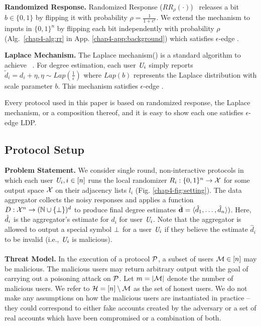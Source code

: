 \noindent\textbf{Randomized Response.} Randomized Response ($RR_\rho(\cdot)$)~\cite{RR} releases a bit $b \in \{0,1\}$ by
flipping it with probability $\rho = \frac{1}{1+e^\epsilon}$. We extend the
mechanism to inputs in $\{0,1\}^n$ by flipping each bit independently with
probability $\rho$ (Alg.~\ref{chap4-alg:rr} in App. \ref{chap4-app:background}) which satisfies
 $\epsilon$-edge \DP. 
 
\noindent\textbf{Laplace Mechanism.} 
The Laplace mechanism(\RLap) is a standard algorithm to achieve \DP~\cite{Dwork}. For degree estimation, each user $\textit{U}_i$ simply reports $\tilde{d}_i=d_i+\eta, \eta \sim Lap(\frac{1}{\epsilon})$ where $Lap(b)$ represents the Laplace distribution with scale parameter $b$. This mechanism satisfies $\epsilon$-edge \DP. 

Every protocol used in this paper is based on randomized response, the Laplace mechanism, or a composition thereof, and it is easy to show each one satisfies $\epsilon$-edge LDP.

\subsection{Protocol Setup}
\noindent\textbf{Problem Statement.}  
We consider single round,  non-interactive protocols in which each user $\textit{U}_i, i \in [n]$ runs the local randomizer
$R_i : \{0,1\}^n \rightarrow \mathcal{X}$ for some output space $\mathcal{X}$ on their adjacency lists $l_i$ (Fig. \ref{chap4-fig:setting}). The data aggregator collects the noisy responses and applies a function 
$D : \mathcal{X}^n \rightarrow (\mathbb{N} \cup \{\perp\})^d$ to produce final degree estimates  $\hat{\textbf{d}}=\langle \hat{d}_1, \ldots, \hat{d}_n\rangle)$. Here, $\hat{d}_i$ is the aggregator's estimate for $d_i$ for user $\textit{U}_i$. Note that the aggregator is allowed to output a special symbol $\perp$ for a user $\textit{U}_i$ if they believe the estimate $\hat{d}_i$ to be invalid (i.e., $\textit{U}_i$ is malicious).
  \vspace{-0.2cm}  \\\\
\noindent\textbf{Threat Model.}
In the execution of a protocol $\mathcal{P}$, a subset of users $\mathcal{M} \in [n]$ may be malicious. The malicious users may return arbitrary output with the goal of carrying out a poisoning attack on  $\mathcal{P}$. Let
$m=|\mathcal{M}|$ denote the number of malicious users. We refer to 
$\mathcal{H} = [n] \setminus \mathcal{M}$ as the set of honest users.
We do not make any assumptions on how the malicious users are instantiated in practice -- they could correspond to either fake accounts created by the adversary or a set of real accounts which have been compromised or a combination of both. 

